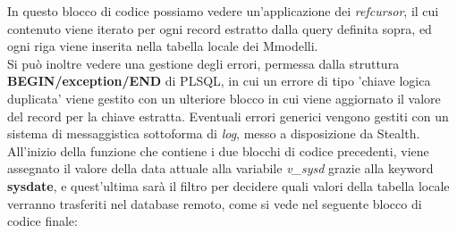 In questo blocco di codice possiamo vedere un'applicazione dei \textit{refcursor}, il cui contenuto viene iterato per ogni record estratto dalla query definita sopra, ed ogni riga viene inserita nella tabella locale dei Mmodelli.\\
Si può inoltre vedere una gestione degli errori, permessa dalla struttura \textbf{BEGIN/exception/END} di PLSQL, in cui un errore di tipo 'chiave logica duplicata' viene gestito con un ulteriore blocco in cui viene aggiornato il valore del record per la chiave estratta. Eventuali errori generici vengono gestiti con un sistema di messaggistica sottoforma di \textit{log}, messo a disposizione da Stealth.\\
All'inizio della funzione che contiene i due blocchi di codice precedenti, viene assegnato il valore della data attuale alla variabile \textit{v\_sysd} grazie alla keyword \textbf{sysdate}, e quest'ultima sarà il filtro per decidere quali valori della tabella locale verranno trasferiti nel database remoto, come si vede nel seguente blocco di codice finale:
